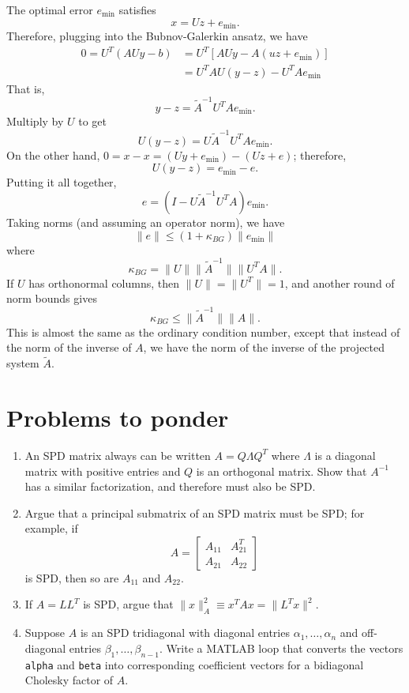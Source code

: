 \documentclass[12pt, leqno]{article}
\begin{document}
The optimal error $e_{\min}$ satisfies
\[
  x = Uz + e_{\min}.
\]
Therefore, plugging into the Bubnov-Galerkin ansatz, we have
\begin{align*}
0 = U^T (AUy-b)
&= U^T \left[ AUy - A(uz+e_{\min}) \right] \\
&= U^T A U (y-z) - U^T A e_{\min}
\end{align*}
That is,
\[
  y-z = \tilde{A}^{-1} U^T A e_{\min}.
\]
Multiply by $U$ to get
\[
  U(y-z) = U \tilde{A}^{-1} U^T A e_{\min}.
\]
On the other hand, $0 = x-x = (Uy+e_{\min})-(Uz+e)$; therefore,
\[
  U(y-z) = e_{\min}-e.
\]
Putting it all together,
\[
  e = (I-U \tilde{A}^{-1} U^T A) e_{\min}.
\]
Taking norms (and assuming an operator norm), we have
\[
  \|e\| \leq (1 + \kappa_{BG}) \|e_{\min}\|
\]
where
\[
  \kappa_{BG} = \|U\| \|\tilde{A}^{-1}\| \|U^T A\|.
\]
If $U$ has orthonormal columns, then $\|U\| = \|U^T\| = 1$, and
another round of norm bounds gives
\[
  \kappa_{BG} \leq \|\tilde{A}^{-1}\| \|A\|.
\]
This is almost the same as the ordinary condition number, except
that instead of the norm of the inverse of $A$, we have the norm
of the inverse of the projected system $\tilde{A}$.

\newpage
\section*{Problems to ponder}

\begin{enumerate}
\item
  An SPD matrix always can be written $A = Q \Lambda Q^T$ where
  $\Lambda$ is a diagonal matrix with positive entries and $Q$ is
  an orthogonal matrix.  Show that $A^{-1}$ has a similar
  factorization, and therefore must also be SPD.
\item
  Argue that a principal submatrix of an SPD matrix must be SPD;
  for example, if
  \[
    A = \begin{bmatrix} A_{11} & A_{21}^T \\ A_{21} & A_{22} \end{bmatrix}
  \]
  is SPD, then so are $A_{11}$ and $A_{22}$.
\item
  If $A = LL^T$ is SPD, argue that
  $\|x\|_A^2 \equiv x^T A x = \|L^T x\|^2$.
\item
  Suppose $A$ is an SPD tridiagonal with diagonal entries
  $\alpha_{1}, \ldots, \alpha_n$ and off-diagonal entries
  $\beta_1, \ldots, \beta_{n-1}$.  Write a MATLAB loop that converts
  the vectors {\tt alpha} and {\tt beta} into corresponding
  coefficient vectors for a bidiagonal Cholesky factor of $A$.
\end{enumerate}
\end{document}
